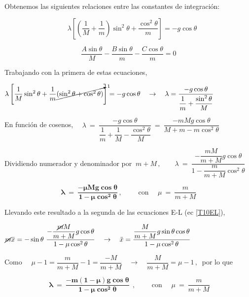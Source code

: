 Obtenemos las siguientes relaciones entre las constantes de integración:

\begin{multicols}{2}
\begin{equation}
	\quad\lambda  \left[ \left( \dfrac 1M + \dfrac 1m \right) \sin^2 \theta + \dfrac{\cos^2 \theta}{m} \right] = - g \cos \theta
\end{equation}

\begin{equation}
	\label{T10relacctesinteg}
	\dfrac{A \sin \theta}{M} - \dfrac{B \sin \theta}{m} - \dfrac{C \cos \theta}{m}=0 
\end{equation}
\end{multicols}

Trabajando con la primera de estas ecuaciones,

$\lambda \left[ \dfrac 1M \sin^2 \theta + \dfrac 1 m \cancelto{1}{(\sin^2 \theta + \cos^2 \theta)} \right] = - g \cos \theta \quad \to \quad \lambda= \dfrac{-g \cos \theta}{\dfrac 1 m + \dfrac {\sin^2 \theta} M }$

En función de cosenos, $\quad \lambda \ = \ \dfrac{-g \cos \theta}{\dfrac 1 m +\dfrac 1 M - \dfrac{\cos^2 \theta}{M} } \ = \ \dfrac{-mMg\cos \theta}{M+m-m\cos^2 \theta}$

Dividiendo numerador y denominador por $\ m+M\, , \qquad \lambda \ = \ \dfrac{-\dfrac{mM}{m+M}g \cos \theta}{1-\dfrac{m}{m+M}\cos^2 \theta}$

\begin{equation}
\label{T10lambda}
\boldsymbol{
\lambda \ = \ \dfrac{-\mu M g \cos \theta}{1-\mu \cos^2 \theta}} \, , \qquad \text{ con } \quad \mu \ = \ \dfrac{m}{m+M}	
\end{equation}

Llevando este resultado a la segunda de las ecuaciones E-L (ec \ref{T10EL}),

$\cancel{m} \ddot x = -\sin \theta \ \dfrac{- \dfrac{\cancel{m}M}{m+M} g \cos \theta}{1-\mu \cos^2 \theta} \quad \to \quad \ddot x =  \dfrac{\dfrac{M}{m+M} g \sin \theta \cos \theta}{1-\mu \cos^2 \theta}$

Como $\quad \mu-1=\dfrac{m}{m+M} -1 = \dfrac{-M}{m+M} \quad \to \quad \dfrac{M}{m+M}=\mu-1\, , \ $ por lo que

\begin{equation}
\label{T10lambda2}
\boxed{ \ \boldsymbol{
\lambda \ = \ \dfrac{-m(1-\mu) g \cos \theta}{1-\mu \cos^2 \theta}} \ } \ , \qquad \text{ con } \quad \mu \ = \ \dfrac{m}{m+M}	
\end{equation}

